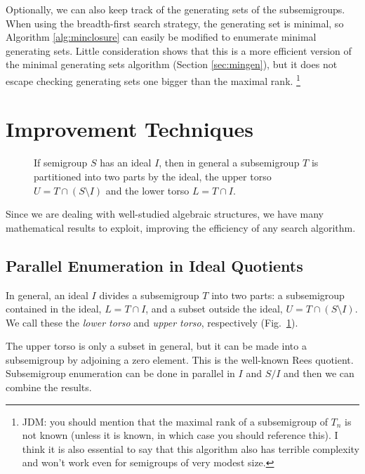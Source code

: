 \documentclass{amsart}
\theoremstyle{plain}
\theoremstyle{definition}
\begin{document}
Optionally, we can also keep track of the generating sets of the subsemigroups.
When using the breadth-first search strategy, the generating set is minimal, so Algorithm \ref{alg:minclosure} can easily be modified to enumerate minimal generating sets.
Little consideration shows that this is a more efficient version of the minimal generating sets algorithm (Section \ref{sec:mingen}), but it does not escape checking generating sets one bigger than the maximal rank.
\footnote{JDM: you should mention that the maximal rank of a subsemigroup of
  $T_n$ is not known (unless it is known, in which case you should reference
  this). I think it is also essential to say that this algorithm also has
terrible complexity and won't work even for semigroups of very modest size.}


\section{Improvement Techniques}
\label{sec:techniques}

\begin{figure}[t]
\begin{center}

\caption{If semigroup $S$ has an ideal $I$, then in general a subsemigroup $T$ is partitioned into two parts by the ideal, the upper torso $U=T\cap (S\setminus I)$ and the lower torso $L=T\cap I$.}
\label{fig:torsos}
\end{center}
\end{figure}

Since we are dealing with well-studied algebraic structures, we have many mathematical results to exploit, improving the efficiency of any  search algorithm.
\subsection{Parallel Enumeration in Ideal Quotients}
\label{sec:idealparallel}
In general, an ideal $I$ divides a subsemigroup $T$ into two parts: a subsemigroup contained in the ideal, $L=T\cap I$, and a subset outside the ideal, $U=T\cap (S\setminus I)$. We call these the \emph{lower torso} and \emph{upper torso}, respectively (Fig.\ \ref{fig:torsos}).

The upper torso is only a subset in general, but it can be made into a subsemigroup by adjoining a zero element. This is the well-known Rees quotient. 
Subsemigroup enumeration can be done in parallel in $I$ and $S/I$  and then  we can combine the results.
\end{document}
